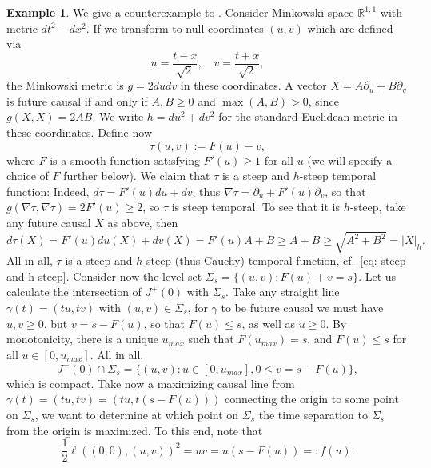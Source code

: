 \documentclass[a4paper,11pt]{article}
\numberwithin{equation}{section}
\theoremstyle{definition}
\newtheorem{Example}[Definition]{Example}
\theoremstyle{plain}
\newcommand{\R}{\mathbb R}
\begin{document}
\begin{Example}
We give a counterexample to 
\cite[Lemma 3.2]{ZhuWuCui}. Consider Minkowski space $\R^{1,1}$ with metric $dt^2 - dx^2$. If we transform to null coordinates $(u,v)$ which are defined via
\begin{equation}
    u = \frac{t - x}{\sqrt{2}}, \quad v = \frac{t + x}{\sqrt{2}},
\end{equation}
the Minkowski metric is $g = 2dudv$ in these coordinates.
A vector $X = A \partial_u + B \partial_v$ is future causal if and only if $A,B \geq 0$ and $\max(A,B) > 0$, since $g(X,X) = 2AB$. We write $h = du^2 + dv^2$ for the standard Euclidean metric in these coordinates. Define now
\begin{equation}
    \tau(u,v):=F(u) + v,
\end{equation}
where $F$ is a smooth function satisfying $F'(u) \geq 1$ for all $u$ (we will specify a choice of $F$ further below). We claim that $\tau$ is a steep and $h$-steep temporal function: Indeed, $d\tau = F'(u) du + dv$, thus $\nabla \tau = {\partial_u} + F'(u) \partial_v$, so that $g(\nabla \tau, \nabla \tau) = 2 F'(u) \geq 2$, so $\tau$ is steep temporal. To see that it is $h$-steep, take any future causal $X$ as above, then
\begin{equation}
\label{eq: tau hsteep}
    d\tau (X) = F'(u) du(X) + dv(X) = F'(u) A + B \geq A + B \geq \sqrt{A^2 + B^2} = |X|_h.
\end{equation}
All in all, $\tau$ is a steep and $h$-steep (thus Cauchy) temporal function, cf.\ \eqref{eq: steep and h steep}. Consider now the level set $\Sigma_s = \{(u,v) : F(u) + v = s\}$. Let us calculate the intersection of $J^+(0)$ with $\Sigma_s$. Take any straight line $\gamma(t) = (tu,tv)$ with $(u,v) \in \Sigma_s$, for $\gamma$ to be future causal we must have $u,v \geq 0$, but $v = s - F(u)$, so that $F(u) \leq s$, as well as $u \geq 0$. By monotonicity, there is a unique $u_{max}$ such that $F(u_{max}) = s$, and $F(u) \leq s$ for all $u \in [0,u_{max}]$. All in all,
\begin{equation}
    J^+(0) \cap \Sigma_s = \{(u,v) : u \in [0,u_{max}], 0 \leq v = s - F(u)\},
\end{equation}
which is compact. Take now a maximizing causal line from $\gamma(t) = (tu,tv) =(tu,t(s - F(u)))$ connecting the origin to some point on $\Sigma_s$, we want to determine at which point on $\Sigma_s$ the time separation to $\Sigma_s$ from the origin is maximized. To this end, note that
\begin{equation}
    \frac12\ell((0,0),(u,v))^2 = uv = u(s - F(u)) =:f(u).

\end{equation}
\end{Example}
\end{document}
